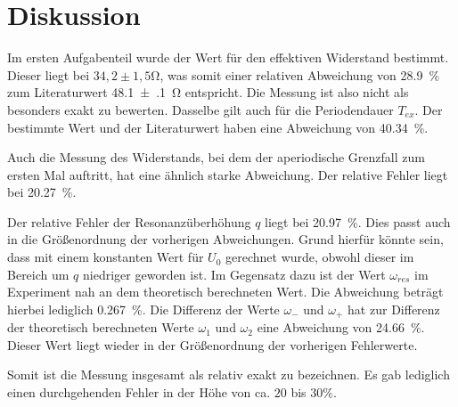 \section{Diskussion}
\label{sec:Diskussion}

Im ersten Aufgabenteil wurde der Wert für den effektiven Widerstand bestimmt. Dieser liegt bei 
$34,2 \pm 1,5$\si{\ohm}, was somit einer relativen Abweichung von \SI{28.9}{\percent} zum Literaturwert 
\SI{48.1(1)}{\ohm} entspricht. Die Messung ist also nicht als besonders exakt zu bewerten. Dasselbe gilt auch für 
die Periodendauer $T_{ex}$. Der bestimmte Wert und der Literaturwert haben eine Abweichung von 
\SI{40.34}{\percent}.

\noindent Auch die Messung des Widerstands, bei dem der aperiodische Grenzfall zum ersten Mal auftritt, hat eine ähnlich 
starke Abweichung. Der relative Fehler liegt bei \SI{20.27}{\percent}.

\noindent Der relative Fehler der Resonanzüberhöhung $q$ liegt bei \SI{20.97}{\percent}. Dies passt auch in die Größenordnung 
der vorherigen Abweichungen. Grund hierfür könnte sein, dass mit einem konstanten Wert für $U_0$ gerechnet wurde, 
obwohl dieser im Bereich um $q$ niedriger geworden ist. Im Gegensatz dazu ist der Wert $\omega_{res}$ im Experiment nah 
an dem theoretisch berechneten Wert. Die Abweichung beträgt hierbei lediglich \SI{0.267}{\percent}. Die 
Differenz der Werte $\omega_{-}$ und $\omega_{+}$ hat zur Differenz der theoretisch berechneten Werte $\omega_{1}$ 
und $\omega_{2}$ eine Abweichung von \SI{24.66}{\percent}. Dieser Wert liegt wieder in der Größenordnung der 
vorherigen Fehlerwerte. 

\noindent Somit ist die Messung insgesamt als relativ exakt zu bezeichnen. Es gab lediglich einen durchgehenden Fehler in der 
Höhe von ca. $20$ bis $30 \si{\percent}$.  